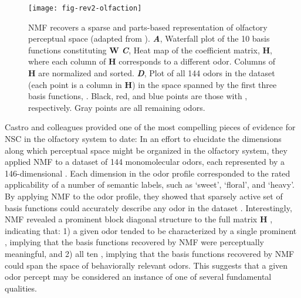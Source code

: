 \begin{figure}[b!]
	\centering
	\texttt{[image: fig-rev2-olfaction]}
    \caption{\ac{NMF} recovers a sparse and parts-based representation
    of olfactory perceptual space (adapted  
    from \cite{Castro2013}).
       \textbf{\emph{A}},
          Waterfall plot of the 10 basis functions constituting \textbf{W}
       \textbf{\emph{C}},
          Heat map of the  coefficient matrix, \textbf{H},
          where each column of \textbf{H} corresponds to a different odor.
          Columns of \textbf{H} are normalized and sorted.
       \textbf{\emph{D}},
          Plot of all 144 odors in the dataset (each point is a column in \textbf{H})
          in the space spanned by the first three basis functions,
          .
          Black, red, and blue points are those with 
          , respectively. 
          Gray points are all remaining odors.}
	\label{fig:evidence-olfaction}
\end{figure}

Castro and colleagues \cite{Castro2013} provided 
one of the most compelling pieces of evidence for \ac{NSC}
in the olfactory system to date:
In an effort to elucidate the dimensions along which perceptual space might be
organized in the olfactory system,
they applied \ac{NMF} to a dataset of 144 monomolecular odors,
each represented by a 146-dimensional .
Each dimension in the odor profile corresponded to the rated applicability of
a number of semantic labels, such as `sweet', `floral', and `heavy'.
By applying \ac{NMF} to the odor profile, they showed that 
 sparsely active set of basis functions 
could accurately describe any odor in the dataset
.
Interestingly, \ac{NMF} revealed a prominent block
diagonal structure to the full matrix \textbf{H}
, indicating that:
1) a given odor tended to be characterized by a single prominent ,
implying that the basis functions recovered by \ac{NMF} were perceptually meaningful,
and 2) all ten ,
implying that the basis functions recovered by \ac{NMF} could span the space of
behaviorally relevant odors.
This suggests that a given odor percept may be considered an 
instance of one of several fundamental qualities.

